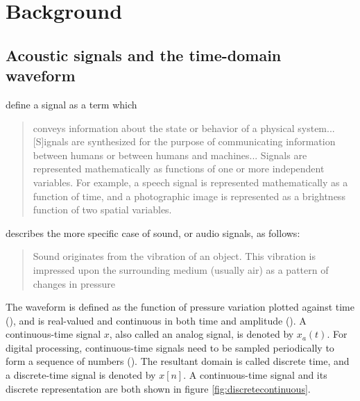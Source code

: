 \documentclass[report.tex]{subfiles}
\begin{document}
\section{Background}
\label{sec:background}

\subsection{Acoustic signals and the time-domain waveform}
\label{sec:timedomain}

\textcite[Chapter~2]{discretebook} define a signal as a term which

\begin{quote}
	conveys information about the state or behavior of a physical system... [S]ignals are synthesized for the purpose of communicating information between humans or between humans and machines... Signals are represented mathematically as functions of one or more independent variables. For example, a speech signal is represented mathematically as a function of time, and a photographic image is represented as a brightness function of two spatial variables.
\end{quote}

\textcite[Chapter~2]{moore} describes the more specific case of sound, or audio signals, as follows:

\begin{quote}
	Sound originates from the vibration of an object. This vibration is impressed upon the surrounding medium (usually air) as a pattern of changes in pressure
\end{quote}

The waveform is defined as the function of pressure variation plotted against time (\cite{moore, melbook}), and is real-valued and continuous in both time and amplitude (\cite[Chapter~2]{melbook}). A continuous-time signal $x$, also called an analog signal, is denoted by $x_{a}(t)$. For digital processing, continuous-time signals need to be sampled periodically to form a sequence of numbers (\cite[Chapter~2]{discretebook}). The resultant domain is called discrete time, and a discrete-time signal is denoted by $x[n]$.  A continuous-time signal and its discrete representation are both shown in figure \ref{fig:discretecontinuous}.
\end{document}
